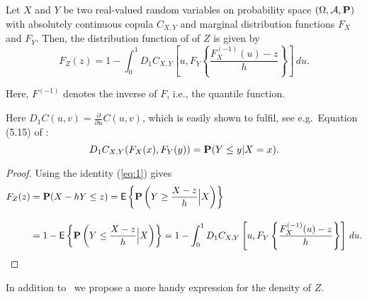 
\begin{proposition}
  \label{prop:dfrh}
  Let $X$ and $Y$ be two real-valued  random
  variables on 
  probability space $(\Omega, \mathcal A, {\bf P})$ with 
  absolutely continuous copula $C_{X, Y}$ and
   marginal distribution functions $F_{X}$
  and $F_{Y}$. Then, the distribution function of of $Z$ is given by 
  \begin{equation}
    \label{eq:3}
    F_{Z}(z) = 1- \int^1_0 D_1 C_{X, Y}
    \left[ u, F_{Y} \left\{ \frac{F^{(-1)}_{X}(u)-z}{h} \right\}
    \right]\, d u.
  \end{equation}
\end{proposition}
Here, $F^{(-1)}$ denotes the inverse of $F$, i.e., the quantile
function. 

Here $D_1 C(u,v)=\displaystyle \frac{\partial}{\partial u} C(u,v)$,
which is easily shown to fulfil, see e.g.\ Equation (5.15) of
\citep{McNeil2005}:
\begin{equation}
  \label{eq:1}
  D_1 C_{X,Y}(F_X(x), F_Y(y)) = {\bf P}(Y\leq y|X=x).
\end{equation}
\begin{proof}
  Using the identity (\ref{eq:1}) gives
  \begin{align*}
    F_{Z}(z) &= \p(X - h Y\leq z) %
                 = \mbox{\sf E}\left\{\p\left(Y\geq \frac{X-z}{h}\Big|
                 X\right)\right\}\\[10pt]
               &= 1-\mbox{\sf E}\left\{\p\left(Y\leq \frac{X-z}{h}\Big|
                 X\right)\right\}%
               = 1- \int_0^1 D_1 C_{X, Y}\left[u,
                 F_{Y}\left\{\frac{F^{(-1)}_{X}(u) -
                 z}{h}\right\}\right]\, d u.
  \end{align*}
  \end{proof}


In addition to~\cite{barbi2014copula} we propose a more handy
expression for the density of $Z$. 

